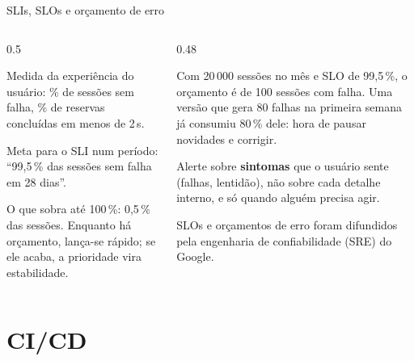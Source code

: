 \documentclass[aspectratio=169,10pt]{beamer}
\begin{document}
\begin{frame}{SLIs, SLOs e orçamento de erro}
  \begin{columns}[T]
    \begin{column}{0.5\textwidth}
      \begin{definicao}
        Medida da experiência do usuário: \% de sessões sem falha, \% de reservas concluídas em menos de 2\,s.
      \end{definicao}
      \begin{definicao}
        Meta para o SLI num período: ``99,5\,\% das sessões sem falha em 28 dias''.
      \end{definicao}
      \begin{definicao}
        O que sobra até 100\,\%: 0,5\,\% das sessões. Enquanto há orçamento, lança-se rápido; se ele acaba, a prioridade vira estabilidade.
      \end{definicao}
    \end{column}
    \begin{column}{0.48\textwidth}
      \begin{exemplo}
        Com 20\,000 sessões no mês e SLO de 99,5\,\%, o orçamento é de 100 sessões com falha. Uma versão que gera 80 falhas na primeira semana já consumiu 80\,\% dele: hora de pausar novidades e corrigir.
      \end{exemplo}
      \begin{conceito}[Alertas]
        Alerte sobre \textbf{sintomas} que o usuário sente (falhas, lentidão), não sobre cada detalhe interno, e só quando alguém precisa agir.
      \end{conceito}
      \begin{historia}
        SLOs e orçamentos de erro foram difundidos pela engenharia de confiabilidade (SRE) do Google.
      \end{historia}
    \end{column}
  \end{columns}
\end{frame}

\section{CI/CD}
\end{document}
